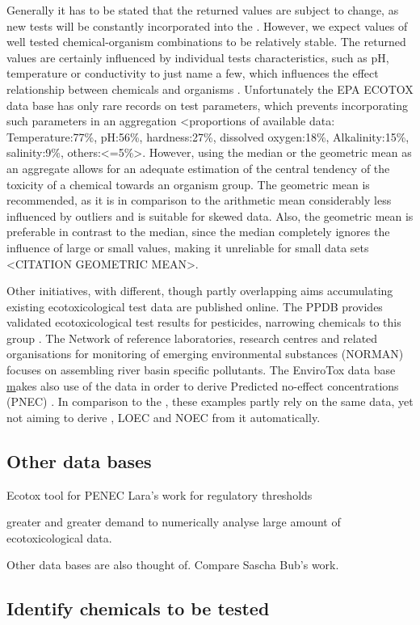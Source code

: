 Generally it has to be stated that the returned values are subject to change, as new tests will be constantly incorporated into the \etoxbase{}. However, we expect values of well tested chemical-organism combinations to be relatively stable. The returned values are certainly influenced by individual tests characteristics, such as pH, temperature or conductivity to just name a few, which influences the effect relationship between chemicals and organisms \citep{rosenkrantz_influence_2013,li_temperature_2011}. Unfortunately the EPA ECOTOX data base has only rare records on test parameters, which prevents incorporating such parameters in an aggregation <proportions of available data: Temperature:77\%, pH:56\%, hardness:27\%, dissolved oxygen:18\%, Alkalinity:15\%, salinity:9\%, others:<=5\%>. However, using the median or the geometric mean as an aggregate allows for an adequate estimation of the central tendency of the toxicity of a chemical towards an organism group. The geometric mean is recommended, as it is in comparison to the arithmetic mean considerably less influenced by outliers and is suitable for skewed data. Also, the geometric mean is preferable in contrast to the median, since the median completely ignores the influence of large or small values, making it unreliable for small data sets <CITATION GEOMETRIC MEAN>.

Other initiatives, with different, though partly overlapping aims accumulating existing ecotoxicological test data are published online. The PPDB provides validated ecotoxicological test results for pesticides, narrowing chemicals to this group \citep{lewis_international_2016}. The Network of reference laboratories, research centres and related organisations for monitoring of emerging environmental substances (NORMAN) focuses on assembling river basin specific pollutants\citep{von_der_ohe_new_2011}. The EnviroTox data base \href{https://envirotoxdatabase.org/} makes also use of the \epa{} data in order to derive Predicted no-effect concentrations (PNEC) \citep{health_and_environmental_sciences_institute_hesi_envirotox_2019}. In comparison to the \etoxbase, these examples partly rely on the same data, yet not aiming to derive \ecfifty, LOEC and NOEC from it automatically.
\subsection*{Other data bases}

Ecotox tool for PENEC
Lara's work for regulatory thresholds


greater and greater demand to numerically  analyse large amount of ecotoxicological data.

Other data bases are also thought of. Compare Sascha Bub's work.



\subsection*{Identify chemicals to be tested}






\pagebreak